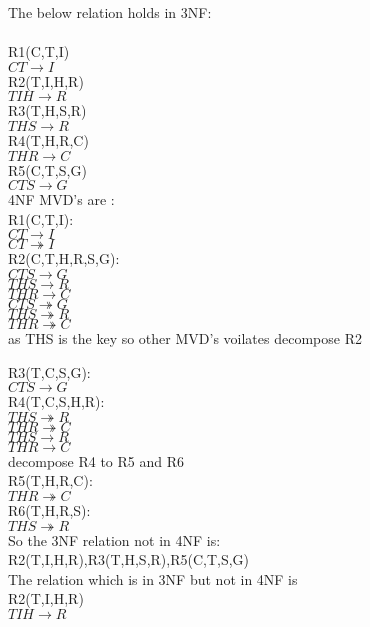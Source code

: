 The below relation holds in 3NF:\\ \\
R1(C,T,I)\\
$CT \rightarrow I$\\ 
R2(T,I,H,R)\\
$TIH \rightarrow R$\\ 
R3(T,H,S,R)\\
$THS \rightarrow R$\\ 
R4(T,H,R,C)\\ 
$THR \rightarrow C$\\ 
R5(C,T,S,G)\\
$CTS \rightarrow G$\\

4NF MVD's are :\\
R1(C,T,I):\\
$CT \rightarrow I$\\
$CT \twoheadrightarrow I$\\

R2(C,T,H,R,S,G):\\
$CTS \rightarrow G$\\
$THS \rightarrow R$\\
$THR \rightarrow C$\\
$CTS \twoheadrightarrow G$\\
$THS \twoheadrightarrow R$\\
$THR \twoheadrightarrow C$\\

as THS is the key so other MVD's voilates decompose R2

R3(T,C,S,G):\\
$CTS \rightarrow G$\\

R4(T,C,S,H,R):\\
$THS \twoheadrightarrow R$\\
$THR \twoheadrightarrow C$\\
$THS \rightarrow R$\\
$THR \rightarrow C$\\
decompose R4 to R5 and R6\\

R5(T,H,R,C):\\
$THR \twoheadrightarrow C$\\

R6(T,H,R,S):\\
$THS \twoheadrightarrow R$\\


So the 3NF relation not in 4NF is:\\
R2(T,I,H,R),R3(T,H,S,R),R5(C,T,S,G) \\ 
The relation which is in 3NF but not in 4NF is\\ 
R2(T,I,H,R)\\
$TIH \rightarrow R$\\ \\